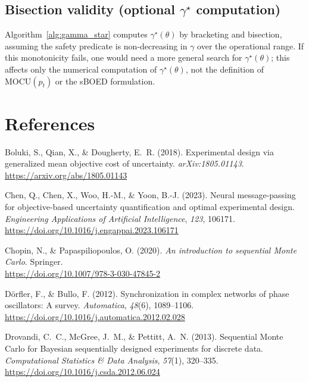 \documentclass[10pt]{article}
\newcommand{\MOCU}{\mathrm{MOCU}}
\begin{document}
\subsection{Bisection validity (optional $\gamma^\star$ computation)}

Algorithm~\ref{alg:gamma_star} computes $\gamma^\star(\theta)$ by bracketing and bisection, assuming the safety predicate is non-decreasing in $\gamma$ over the operational range. If this monotonicity fails, one would need a more general search for $\gamma^\star(\theta)$; this affects only the numerical computation of $\gamma^\star(\theta)$, not the definition of $\MOCU(p_t)$ or the sBOED formulation.

\section*{References}

\begingroup
\raggedright
\setlength{\parindent}{0pt}
\setlength{\leftskip}{0pt}
\setlength{\parskip}{0.6em}

Boluki, S., Qian, X., \& Dougherty, E.~R. (2018). Experimental design via generalized mean objective cost of uncertainty. \emph{arXiv:1805.01143}.\\
\url{https://arxiv.org/abs/1805.01143}

Chen, Q., Chen, X., Woo, H.-M., \& Yoon, B.-J. (2023). Neural message-passing for objective-based uncertainty quantification and optimal experimental design. \emph{Engineering Applications of Artificial Intelligence}, \emph{123}, 106171.\\
\url{https://doi.org/10.1016/j.engappai.2023.106171}

Chopin, N., \& Papaspiliopoulos, O. (2020). \emph{An introduction to sequential Monte Carlo}. Springer.\\
\url{https://doi.org/10.1007/978-3-030-47845-2}

D\"orfler, F., \& Bullo, F. (2012). Synchronization in complex networks of phase oscillators: A survey. \emph{Automatica}, \emph{48}(6), 1089--1106.\\
\url{https://doi.org/10.1016/j.automatica.2012.02.028}

Drovandi, C.~C., McGree, J.~M., \& Pettitt, A.~N. (2013). Sequential Monte Carlo for Bayesian sequentially designed experiments for discrete data. \emph{Computational Statistics \& Data Analysis}, \emph{57}(1), 320--335.\\
\url{https://doi.org/10.1016/j.csda.2012.06.024}
\end{document}
